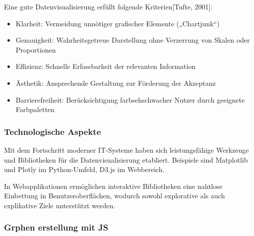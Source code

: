 Eine gute Datenvisualisierung erfüllt folgende Kriterien[Tufte, 2001]:


\begin{itemize}

\item
Klarheit: Vermeidung unnötiger grafischer Elemente („Chartjunk“)
\item
Genauigkeit: Wahrheitsgetreue Darstellung ohne Verzerrung von Skalen oder Proportionen
\item
Effizienz: Schnelle Erfassbarkeit der relevanten Information
\item
Ästhetik: Ansprechende Gestaltung zur Förderung der Akzeptanz
\item
Barrierefreiheit: Berücksichtigung farbsehschwacher Nutzer durch geeignete Farbpaletten

\end{itemize}

\subsubsection{Technologische Aspekte}

Mit dem Fortschritt moderner IT-Systeme haben sich leistungsfähige Werkzeuge und Bibliotheken für die Datenvisualisierung etabliert.
Beispiele sind Matplotlib und Plotly im Python-Umfeld, D3.js im Webbereich.

In Webapplikationen ermöglichen interaktive Bibliotheken eine nahtlose Einbettung in Benutzeroberflächen,
wodurch sowohl explorative als auch explikative Ziele unterstützt werden.

\pagebreak

\subsubsection{Grphen erstellung mit JS}